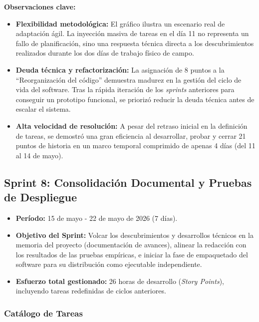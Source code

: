 \noindent\textbf{Observaciones clave:}
\begin{itemize}
    \item \textbf{Flexibilidad metodológica:} El gráfico ilustra un escenario real de adaptación ágil. La inyección masiva de tareas en el día 11 no representa un fallo de planificación, sino una respuesta técnica directa a los descubrimientos realizados durante los dos días de trabajo físico de campo.
    \item \textbf{Deuda técnica y refactorización:} La asignación de 8 puntos a la ``Reorganización del código'' demuestra madurez en la gestión del ciclo de vida del software. Tras la rápida iteración de los \textit{sprints} anteriores para conseguir un prototipo funcional, se priorizó reducir la deuda técnica antes de escalar el sistema.
    \item \textbf{Alta velocidad de resolución:} A pesar del retraso inicial en la definición de tareas, se demostró una gran eficiencia al desarrollar, probar y cerrar 21 puntos de historia en un marco temporal comprimido de apenas 4 días (del 11 al 14 de mayo).
\end{itemize}

\subsection{Sprint 8: Consolidación Documental y Pruebas de Despliegue}

\begin{itemize}
    \item \textbf{Período:} 15 de mayo - 22 de mayo de 2026 (7 días).
    \item \textbf{Objetivo del Sprint:} Volcar los descubrimientos y desarrollos técnicos en la memoria del proyecto (documentación de avances), alinear la redacción con los resultados de las pruebas empíricas, e iniciar la fase de empaquetado del software para su distribución como ejecutable independiente.
    \item \textbf{Esfuerzo total gestionado:} 26 horas de desarrollo (\textit{Story Points}), incluyendo tareas redefinidas de ciclos anteriores.
\end{itemize}

\subsubsection{Catálogo de Tareas}

